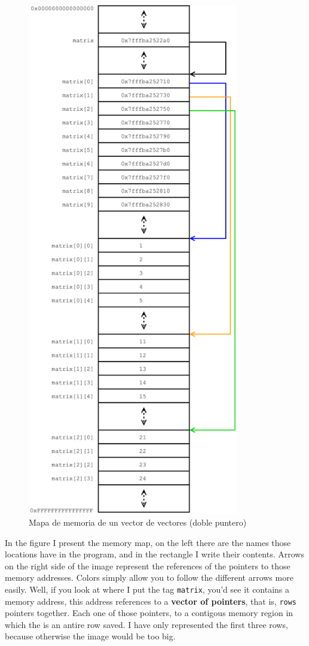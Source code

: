 \documentclass[a4paper]{article}
\begin{document}
\begin{figure}[H]
    \center
    \includegraphics[height=225mm]{double_pointer_map}
    \caption{Mapa de memoria de un vector de vectores (doble puntero)}
    \label{img:double_pointer_map}
\end{figure}

In the figure I present the memory map, on the left there are the names those
locations have in the program, and in the rectangle I write their contents.
Arrows on the right side of the image represent the references of the pointers
to those memory addresses. Colors simply allow you to follow the different
arrows more easily. Well, if you look at where I put the tag \verb!matrix!,
you'd see it contains a memory address, this address references to a
\textbf{vector of pointers}, that is, \verb!rows! pointers together. Each one of
those pointers, to a contigous memory region in which the is an antire row
saved. I have only represented the first three rows, because otherwise the image
would be too big.
\end{document}
